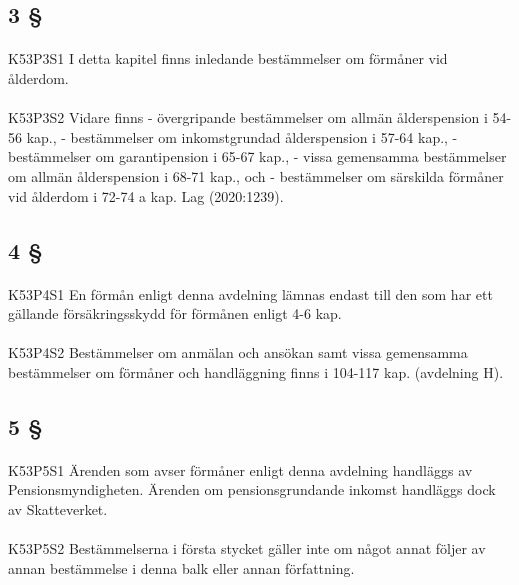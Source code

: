 \documentclass[a4paper,notitlepage,openany,10pt]{book}
\begin{document}
\subsection*{3 §}
\paragraph*{}
{\tiny K53P3S1}
I detta kapitel finns inledande bestämmelser om förmåner vid ålderdom.
\paragraph*{}
{\tiny K53P3S2}
Vidare finns
\newline - övergripande bestämmelser om allmän ålderspension i 54-56 kap.,
\newline - bestämmelser om inkomstgrundad ålderspension i 57-64 kap.,
\newline - bestämmelser om garantipension i 65-67 kap.,
\newline - vissa gemensamma bestämmelser om allmän ålderspension i 68-71 kap., och
\newline - bestämmelser om särskilda förmåner vid ålderdom i 72-74 a kap.
Lag (2020:1239).
\subsection*{4 §}
\paragraph*{}
{\tiny K53P4S1}
En förmån enligt denna avdelning lämnas endast till den som har ett gällande försäkringsskydd för förmånen enligt 4-6 kap.
\paragraph*{}
{\tiny K53P4S2}
Bestämmelser om anmälan och ansökan samt vissa gemensamma bestämmelser om förmåner och handläggning finns i 104-117 kap. (avdelning H).
\subsection*{5 §}
\paragraph*{}
{\tiny K53P5S1}
Ärenden som avser förmåner enligt denna avdelning handläggs av Pensionsmyndigheten. Ärenden om pensionsgrundande inkomst handläggs dock av Skatteverket.
\paragraph*{}
{\tiny K53P5S2}
Bestämmelserna i första stycket gäller inte om något annat följer av annan bestämmelse i denna balk eller annan författning.
\end{document}
